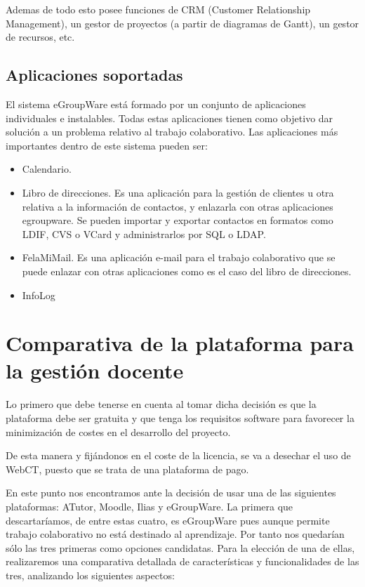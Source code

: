 Ademas de todo esto posee funciones de CRM (Customer Relationship Management), un gestor de proyectos (a partir de diagramas de Gantt), un gestor de recursos, etc.

\subsection{Aplicaciones soportadas}

El sistema eGroupWare está formado por un conjunto de aplicaciones individuales e instalables. Todas estas aplicaciones tienen como objetivo dar solución a un problema relativo al trabajo colaborativo. Las aplicaciones más importantes dentro de este sistema pueden ser:

\begin{itemize}
	\item Calendario.
	\item Libro de direcciones. Es una aplicación para la gestión de clientes u otra relativa a la información de contactos, y enlazarla con otras aplicaciones egroupware. Se pueden importar y exportar contactos en formatos como LDIF, CVS o VCard y administrarlos por SQL o LDAP.
	\item FelaMiMail. Es una aplicación e-mail para el trabajo colaborativo que se puede enlazar con otras aplicaciones como es el caso del libro de direcciones.
	\item InfoLog
\end{itemize}

\section{Comparativa de la plataforma para la gestión docente}

Lo primero que debe tenerse en cuenta al tomar dicha decisión es que la plataforma debe ser gratuita y que tenga los requisitos software para favorecer la minimización de costes en el desarrollo del proyecto.

De esta manera y fijándonos en el coste de la licencia, se va a desechar el uso de WebCT, puesto que se trata de una plataforma de pago.

En este punto nos encontramos ante la decisión de usar una de las siguientes plataformas: ATutor, Moodle, Ilias y eGroupWare. La primera que descartaríamos, de entre estas cuatro, es eGroupWare pues aunque permite trabajo colaborativo no está destinado al aprendizaje. Por tanto nos quedarían sólo las tres primeras como opciones candidatas. Para la elección de una de ellas, realizaremos una comparativa detallada de características y funcionalidades de las tres, analizando los siguientes aspectos:

